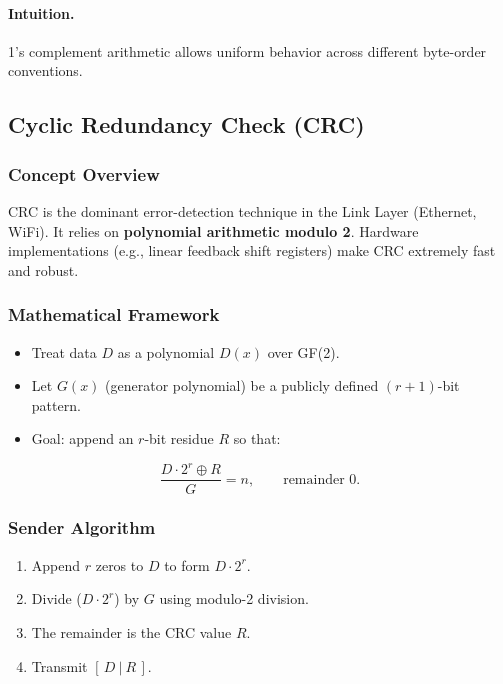 \documentclass[12pt]{article}
\begin{document}
\paragraph{Intuition.}
1's complement arithmetic allows uniform behavior across different byte-order conventions.

\subsection{Cyclic Redundancy Check (CRC)}

\subsubsection{Concept Overview}

CRC is the dominant error-detection technique in the Link Layer (Ethernet, WiFi).
It relies on \textbf{polynomial arithmetic modulo 2}.
Hardware implementations (e.g., linear feedback shift registers) make CRC extremely fast and robust.

\subsubsection{Mathematical Framework}

\begin{itemize}
    \item Treat data $D$ as a polynomial $D(x)$ over GF(2).
    \item Let $G(x)$ (generator polynomial) be a publicly defined $(r+1)$-bit pattern.
    \item Goal: append an $r$-bit residue $R$ so that:
\end{itemize}

\[
    \frac{D \cdot 2^r \oplus R}{G} = n, \qquad \text{remainder } 0.
\]

\subsubsection{Sender Algorithm}

\begin{enumerate}
    \item Append $r$ zeros to $D$ to form $D \cdot 2^r$.
    \item Divide ($D \cdot 2^r$) by $G$ using modulo-2 division.
    \item The remainder is the CRC value $R$.
    \item Transmit $[\, D \ | \ R \,]$.
\end{enumerate}
\end{document}
